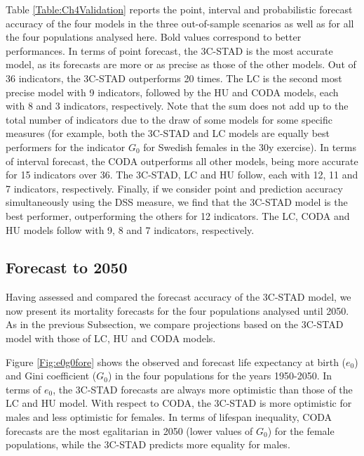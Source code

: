 \documentclass[Thesis]{subfiles}
\begin{document}
Table \ref{Table:Ch4Validation} reports the point, interval and probabilistic forecast accuracy of the four models in the three out-of-sample scenarios as well as for all the four populations analysed here. Bold values correspond to better performances. In terms of point forecast, the 3C-STAD is the most accurate model, as its forecasts are more or as precise as those of the other models. Out of 36 indicators, the 3C-STAD outperforms 20 times. The LC is the second most precise model with 9 indicators, followed by the HU and CODA models, each with 8 and 3 indicators, respectively. Note that the sum does not add up to the total number of indicators due to the draw of some models for some specific measures (for example, both the 3C-STAD and LC models are equally best performers for the indicator $G_{0}$ for Swedish females in the 30y exercise). In terms of interval forecast, the CODA outperforms all other models, being more accurate for 15 indicators over 36. The 3C-STAD, LC and HU follow, each with 12, 11 and 7 indicators, respectively. Finally, if we consider point and prediction accuracy simultaneously using the DSS measure, we find that the 3C-STAD model is the best performer, outperforming the others for 12 indicators. The LC, CODA and HU models follow with 9, 8 and 7 indicators, respectively.


\subsection{Forecast to 2050}\label{Subsec:Ch4subsec3.2}

Having assessed and compared the forecast accuracy of the 3C-STAD model, we now present its mortality forecasts for the four populations analysed until 2050. As in the previous Subsection, we compare projections based on the 3C-STAD model with those of LC, HU and CODA models.

Figure \ref{Fig:e0g0fore} shows the observed and forecast life expectancy at birth ($e_{0}$) and Gini coefficient ($G_{0}$) in the four populations for the years 1950-2050. In terms of $e_{0}$, the 3C-STAD forecasts are always more optimistic than those of the LC and HU model. With respect to CODA, the 3C-STAD is more optimistic for males and less optimistic for females. In terms of lifespan inequality, CODA forecasts are the most egalitarian in 2050 (lower values of $G_{0}$) for the female populations, while the 3C-STAD predicts more equality for males.
\end{document}
